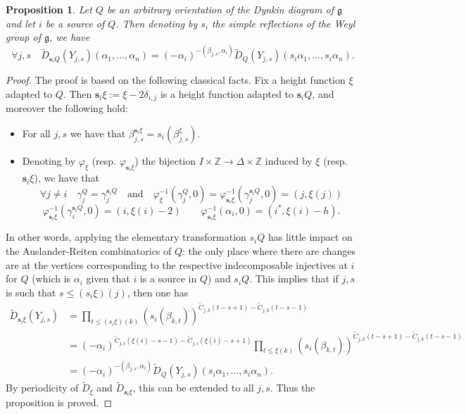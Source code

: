 \documentclass[12pt]{amsart}
\theoremstyle{plain}
\newtheorem{proposition}[theorem]{Proposition}
\theoremstyle{definition}
\numberwithin{equation}{section}
\newcommand{\td}{{\widetilde{D}}}
\begin{document}
   \begin{proposition}
  Let $Q$ be an arbitrary orientation of the Dynkin diagram of $\mathfrak{g}$ and let $i$ be a source of $Q$.  Then denoting by $s_i$ the simple reflections of the Weyl group of $\mathfrak{g}$, we have 
  $$ \forall j,s \quad  \td_{\mathbf{s}_i Q}(Y_{j,s})(\alpha_1, \ldots , \alpha_n) = (-\alpha_i)^{-(\beta_{j,s},\alpha_i)} \td_{Q}(Y_{j,s})(s_i \alpha_1, \ldots, s_i \alpha_n) . $$

   \end{proposition}
   

 \begin{proof}
 The proof is based on the following classical facts. Fix a height function $\xi$ adapted to $Q$. Then $\mathbf{s}_i \xi := \xi - 2 \delta_{i,j}$ is a height function adapted to $\mathbf{s}_iQ$, and moreover the following hold:
  \begin{itemize}
      \item For all $j,s$ we have that $\beta_{j,s}^{\mathbf{s}_i \xi} = s_i(\beta_{j,s}^{\xi})$.
      \item Denoting by $\varphi_{\xi}$ (resp. $\varphi_{\mathbf{s}_i\xi}$) the bijection $I \times \mathbb{Z} \longrightarrow \Delta \times \mathbb{Z}$ induced by $\xi$ (resp. $\mathbf{s}_i \xi$), we have that 
      $$ \forall j \neq i \quad \gamma_j^Q = \gamma_j^{\mathbf{s}_i Q} \quad \text{and} \quad  \varphi_{\xi}^{-1}(\gamma_j^Q,0) = \varphi_{\mathbf{s}_i \xi}^{-1}(\gamma_j^{\mathbf{s}_i Q},0) = (j, \xi(j)) $$
      $$ \varphi_{\mathbf{s}_i \xi}^{-1}(\gamma_i^{\mathbf{s}_i Q},0) = (i, \xi(i)-2) \qquad \varphi_{\mathbf{s}_i \xi}^{-1}(\alpha_i,0) = (i^{*}, \xi(i)-h) . $$
  \end{itemize}
  In other words, applying the elementary transformation $s_iQ$ has little impact on the Auslander-Reiten combinatorics of $Q$: the only place where there are changes are at the vertices corresponding to the respective indecomposable injectives at $i$ for $Q$ (which is $\alpha_i$ given that $i$ is a source in $Q$) and $s_iQ$. 
 This implies that if $j,s$ is such that $s \leq (s_i\xi)(j)$, then one has 
 \begin{align*}
 \td_{\mathbf{s}_i \xi}(Y_{j,s}) &= \prod_{t \leq (s_i\xi)(k)} (s_i(\beta_{k,t}))^{\widetilde{C}_{j,k}(t-s+1) - \widetilde{C}_{j,k}(t-s-1)} \\
 &= (- \alpha_i)^{\widetilde{C}_{j,i}(\xi(i)-s-1) - \widetilde{C}_{j,i}(\xi(i)-s+1)} \prod_{t \leq \xi(k)} (s_i(\beta_{k,t}))^{\widetilde{C}_{j,k}(t-s+1) - \widetilde{C}_{j,k}(t-s-1)} \\
 &=  (-\alpha_i)^{-(\beta_{j,s},\alpha_i)} \td_{Q}(Y_{j,s})(s_i \alpha_1, \ldots, s_i \alpha_n) .
 \end{align*}
 By periodicity of $\td_{\xi}$ and $\td_{\mathbf{s}_i \xi}$, this can be extended to all $j,s$. Thus the proposition is proved.
 \end{proof}
\end{document}
